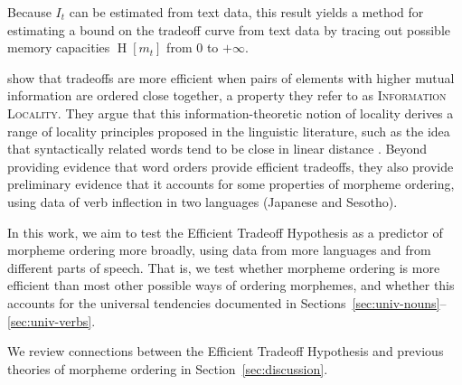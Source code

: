 \documentclass[11pt,letterpaper]{article}
\newcommand{\citep}{\parencite}
\newcommand{\citet}{\Textcite}
\newcommand\becky[1]{{\color{blue}(#1)}}
\newcommand{\jd}[1]{\textcolor{Pink}{[jd: #1]}}
\newcounter{theorem}
\begin{document}
Because $I_t$ can be estimated from text data, this result yields a method for estimating a bound on the tradeoff curve from text data by tracing out possible memory capacities $\operatorname{H}[m_t]$ from $0$ to $+\infty$.


\citet{Hahn2020modeling} show that tradeoffs are more efficient when pairs of elements with higher mutual information are ordered close together, a property they refer to as \textsc{Information Locality}.
They argue that this information-theoretic notion of locality derives a range of locality principles proposed in the linguistic literature, such as the idea that syntactically related words tend to be close in linear distance \citep{rijkhoff-word-1986, hawkins1994performance, futrell-large-scale-2015, liu-dependency-2017, temperley-minimizing-2018, liu2008dependency, Cancho2004EuclideanDB}.
Beyond providing evidence that word orders provide efficient tradeoffs, they also provide preliminary evidence that it accounts for some properties of morpheme ordering, using data of verb inflection in two languages (Japanese and Sesotho).

In this work, we aim to test the Efficient Tradeoff Hypothesis as a predictor of morpheme ordering more broadly, using data from more languages and from different parts of speech.
That is, we test whether morpheme ordering is more efficient than most other possible ways of ordering morphemes, and whether this accounts for the universal tendencies documented in Sections~\ref{sec:univ-nouns}--\ref{sec:univ-verbs}.

We review connections between the Efficient Tradeoff Hypothesis and previous theories of morpheme ordering in Section~\ref{sec:discussion}.




\end{document}
